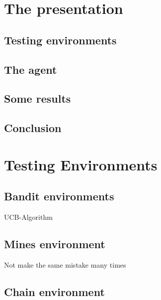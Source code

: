 \documentclass[11pt]{article}
\numberwithin{equation}{section}
\begin{document}
\begin{flushleft}

\section{The presentation}

\text{ } \newline

\subsection{Testing environments}

\subsection{The agent}

\subsection{Some results}

\subsection{Conclusion}

\newpage

\section{Testing Environments}

\text{ } \newline

\subsection{Bandit environments}

UCB-Algorithm
\text{ } \newline

\subsection{Mines environment}

Not make the same mistake many times
\text{ } \newline

\subsection{Chain environment}


\end{flushleft}
\end{document}
